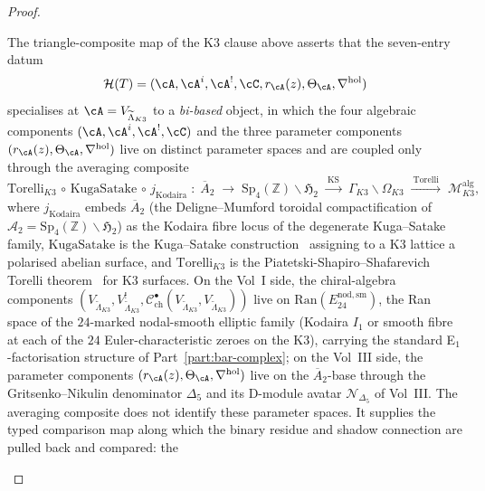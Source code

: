 \begin{proof}
\begin{remark}
\label{rem:holo-master-bi-based-ran}
The triangle-composite map of the K3 clause above asserts that the
seven-entry datum
\[
\mathcal{H}(T)
=
(\cA,\cA^i,\cA^!,\cC,r_\cA(z),\Theta_\cA,\nabla^{\mathrm{hol}})
\]
specialises at
$\cA = V_{\widetilde\Lambda_{K3}}$ to a \emph{bi-based} object, in
which the four algebraic components
$(\cA,\cA^i,\cA^!,\cC)$ and the three parameter components
$(r_\cA(z),\Theta_\cA,\nabla^{\mathrm{hol}})$ live on distinct
parameter spaces and are coupled only through the averaging
composite
\[
 \mathrm{Torelli}_{K3} \,\circ\, \mathrm{KugaSatake}
 \,\circ\, j_{\mathrm{Kodaira}}
 \;\colon\;
 \overline{A}_2
 \;\longrightarrow\;
 \mathrm{Sp}_4(\mathbb{Z}) \backslash \mathfrak{H}_2
 \;\xrightarrow{\ \mathrm{KS}\ }\;
 \Gamma_{K3} \backslash \Omega_{K3}
 \;\xrightarrow{\ \mathrm{Torelli}\ }\;
 \mathcal{M}_{K3}^{\mathrm{alg}},
\]
where $j_{\mathrm{Kodaira}}$ embeds $\overline{A}_2$
(the Deligne--Mumford toroidal compactification of
$\mathcal{A}_2 = \mathrm{Sp}_4(\mathbb{Z}) \backslash \mathfrak{H}_2$)
as the Kodaira fibre locus of the degenerate Kuga--Satake family,
$\mathrm{KugaSatake}$ is the Kuga--Satake
construction~\cite{KugaSatake67} assigning to a K3 lattice a
polarised abelian surface, and $\mathrm{Torelli}_{K3}$ is the
Piatetski-Shapiro--Shafarevich Torelli
theorem~\cite{PiatetskiShapiroShafarevich71} for K3 surfaces.
On the Vol~I side, the chiral-algebra components
$(V_{\widetilde\Lambda_{K3}},
V_{\widetilde\Lambda_{K3}}^!,
\mathcal{C}^\bullet_{\mathrm{ch}}(V_{\widetilde\Lambda_{K3}},
V_{\widetilde\Lambda_{K3}}))$ live on
$\mathrm{Ran}(E_{24}^{\mathrm{nod,sm}})$, the Ran space of the
$24$-marked nodal-smooth elliptic family (Kodaira $I_1$ or smooth
fibre at each of the $24$ Euler-characteristic zeroes on the K3),
carrying the standard E$_1$-factorisation structure of
Part~\ref{part:bar-complex}; on the Vol~III side, the parameter
components $(r_\cA(z), \Theta_\cA, \nabla^{\mathrm{hol}})$ live on
the $\overline{A}_2$-base through the Gritsenko--Nikulin denominator
$\Delta_5$ and its D-module avatar $\mathcal{N}_{\Delta_5}$ of
Vol~III. The averaging composite does not identify these parameter
spaces. It supplies the typed comparison map along which the binary
residue and shadow connection are pulled back and compared: the

\end{remark}
\end{proof}
